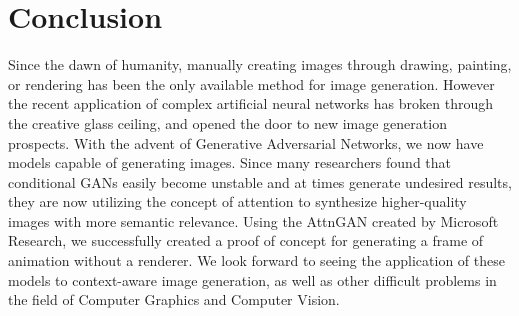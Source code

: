 \documentclass[letterpaper]{article} %
\begin{document}
\section{Conclusion}
\label{sec:conclusion}
Since the dawn of humanity, manually creating images through drawing, 
painting, or rendering has been the only available method for image generation. 
However the recent application of complex artificial neural networks
has broken through the creative glass ceiling, and opened the door to new image 
generation prospects. With the advent of Generative Adversarial Networks, we 
now have models capable of generating images. Since many researchers found that 
conditional GANs easily become unstable and at times generate 
undesired results, they are now utilizing the concept of 
attention to synthesize higher-quality images with more semantic relevance. 
Using the AttnGAN created by Microsoft Research, we successfully created a 
proof of concept for generating a frame of animation without a renderer. We 
look forward to seeing the application of these models to context-aware image 
generation, as well as other difficult problems in the field of Computer 
Graphics and Computer Vision.

\nocite{objgan}
\nocite{mirrorgan}



\end{document}
